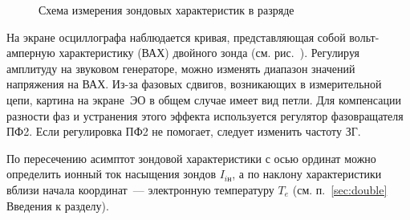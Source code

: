 \begin{figure}[h!]
    \centering
    \small
    \caption{Схема измерения зондовых характеристик в разряде}
\end{figure}

На экране осциллографа наблюдается кривая, представляющая собой вольт-амперную
характеристику (ВАХ) двойного зонда (см. рис.~).
Регулируя амплитуду на звуковом генераторе, можно изменять диапазон значений
напряжения  на ВАХ. Из-за фазовых сдвигов, возникающих в измерительной цепи, 
картина на экране~ЭО в общем случае имеет вид петли.
Для компенсации разности фаз и устранения этого эффекта 
используется регулятор фазовращателя ПФ2. Если регулировка ПФ2 не помогает,
следует изменить частоту ЗГ.

По пересечению асимптот зондовой характеристики с осью ординат
можно определить ионный ток насыщения зондов $I_{iн}$, а по наклону 
характеристики вблизи начала координат~--- электронную температуру $T_e$
(см. п.~\ref{sec:double} Введения к разделу).




